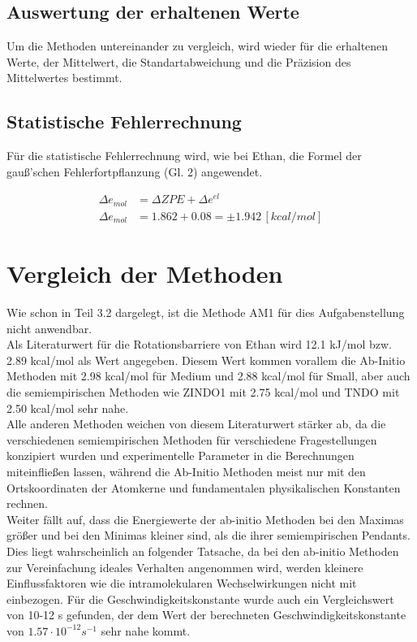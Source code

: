 \subsection{Auswertung der erhaltenen Werte}
Um die Methoden untereinander zu vergleich, wird wieder für die erhaltenen Werte, der Mittelwert, die Standartabweichung und die Präzision des Mittelwertes bestimmt.

 

\subsection{Statistische Fehlerrechnung}

Für die statistische Fehlerrechnung wird, wie bei Ethan, die Formel der gauß'schen Fehlerfortpflanzung (Gl. 2) angewendet.

\begin{align*}
    \Delta e_{mol} &= \Delta ZPE + \Delta e^{el} \\
    \Delta e_{mol} &= 1.862 + 0.08 = \pm 1.942 \, [kcal/mol]
\end{align*}


\section{Vergleich der Methoden}

Wie schon in Teil 3.2 dargelegt, ist die Methode AM1 für dies Aufgabenstellung nicht anwendbar. \\
Als Literaturwert für die Rotationsbarriere von Ethan wird 12.1 kJ/mol  bzw. 2.89 kcal/mol als Wert angegeben.
Diesem Wert kommen vorallem die Ab-Initio Methoden mit 2.98 kcal/mol für Medium und 2.88 kcal/mol für Small, aber auch die semiempirischen
Methoden wie ZINDO1 mit 2.75 kcal/mol und TNDO mit 2.50 kcal/mol sehr nahe.\\ 
Alle anderen Methoden weichen von diesem Literaturwert stärker ab, da die verschiedenen semiempirischen Methoden für verschiedene
Fragestellungen konzipiert wurden und experimentelle Parameter in die Berechnungen miteinfließen lassen, während die Ab-Initio Methoden 
meist nur mit den Ortskoordinaten der Atomkerne und fundamentalen physikalischen Konstanten rechnen. \\
Weiter fällt auf, dass die Energiewerte der ab-initio Methoden bei den Maximas größer und bei den Minimas kleiner sind, als die ihrer 
semiempirischen Pendants. Dies liegt wahrscheinlich an folgender Tatsache, da bei den ab-initio Methoden zur 
Vereinfachung ideales Verhalten angenommen wird, werden kleinere Einflussfaktoren wie die intramolekularen Wechselwirkungen nicht mit einbezogen.
Für die Geschwindigkeitskonstante wurde auch ein Vergleichswert von 10-12 s   gefunden, der dem Wert der berechneten Geschwindigkeitskonstante von 
$1.57 \cdot 10^{-12} s^{-1}$ sehr nahe kommt.